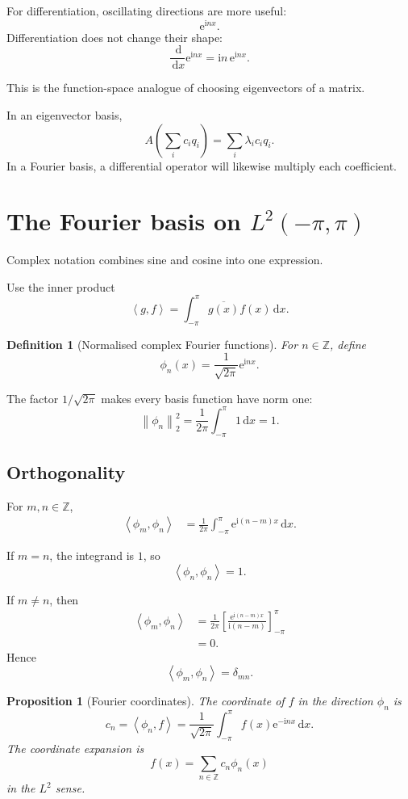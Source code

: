 \documentclass[11pt,a5paper,oneside,openany]{scrreprt}
\theoremstyle{notes}
\newtheorem{proposition}[theorem]{Proposition}
\theoremstyle{definitions}
\newtheorem{definition}[theorem]{Definition}
\newcommand{\Z}{\mathbb{Z}}
\newcommand{\ip}[2]{\left\langle #1,#2\right\rangle}
\newcommand{\norm}[1]{\left\lVert #1\right\rVert}
\newcommand{\dd}{\,\mathrm{d}}
\newcommand{\e}{\mathrm{e}}
\begin{document}
For differentiation, oscillating directions are more useful:
\[
 \e^{\mathrm i nx}.
\]
Differentiation does not change their shape:
\[
 \frac{\dd}{\dd x}\e^{\mathrm i nx}
 =\mathrm i n\,\e^{\mathrm i nx}.
\]

This is the function-space analogue of choosing eigenvectors of a matrix.

In an eigenvector basis,
\[
 A\left(\sum_i c_iq_i\right)
 =\sum_i\lambda_i c_iq_i.
\]
In a Fourier basis, a differential operator will likewise multiply each
coefficient.

\section{The Fourier basis on $L^2(-\pi,\pi)$}

Complex notation combines sine and cosine into one expression.

Use the inner product
\[
 \ip{g}{f}
 =\int_{-\pi}^{\pi}\overline{g(x)}f(x)\dd x.
\]

\begin{definition}[Normalised complex Fourier functions]
For $n\in\Z$, define
\[
 \boxed{\phi_n(x)=\frac1{\sqrt{2\pi}}\e^{\mathrm i nx}.}
\]
\end{definition}

The factor $1/\sqrt{2\pi}$ makes every basis function have norm one:
\[
 \norm{\phi_n}_2^2
 =\frac1{2\pi}\int_{-\pi}^{\pi}1\dd x
 =1.
\]

\subsection*{Orthogonality}

For $m,n\in\Z$,
\[
 \begin{aligned}
 \ip{\phi_m}{\phi_n}
 &=\frac1{2\pi}\int_{-\pi}^{\pi}
   \e^{\mathrm i(n-m)x}\dd x.
 \end{aligned}
\]

If $m=n$, the integrand is $1$, so
\[
 \ip{\phi_n}{\phi_n}=1.
\]

If $m\ne n$, then
\[
 \begin{aligned}
 \ip{\phi_m}{\phi_n}
 &=\frac1{2\pi}
 \left[
 \frac{\e^{\mathrm i(n-m)x}}{\mathrm i(n-m)}
 \right]_{-\pi}^{\pi}\\
 &=0.
 \end{aligned}
\]
Hence
\[
 \boxed{\ip{\phi_m}{\phi_n}=\delta_{mn}.}
\]

\begin{proposition}[Fourier coordinates]
The coordinate of $f$ in the direction $\phi_n$ is
\[
 \boxed{
 c_n=\ip{\phi_n}{f}
 =\frac1{\sqrt{2\pi}}\int_{-\pi}^{\pi}
 f(x)\e^{-\mathrm i nx}\dd x.}
\]
The coordinate expansion is
\[
 \boxed{f(x)=\sum_{n\in\Z}c_n\phi_n(x)}
\]
in the $L^2$ sense.
\end{proposition}
\end{document}
